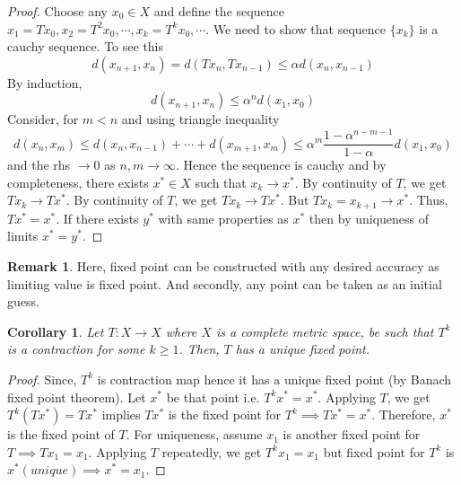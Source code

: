 \documentclass[12pt,reqno]{amsart}
\theoremstyle{plain}
\newtheorem{cor}{Corollary}
\theoremstyle{definition}
\newtheorem{rem}{Remark}
\begin{document}
\begin{proof}
    Choose any $x_0 \in X$ and define the sequence $x_1 = Tx_0, x_2 = T^2x_0, \cdots, x_k = T^kx_0, \cdots.$ We need to show that sequence $\{x_k\}$ is a cauchy sequence. To see this
    $$ d(x_{n+1}, x_n) = d(Tx_n, Tx_{n-1}) \leq \alpha  d(x_n, x_{n-1})$$
    By induction, 
    $$ d(x_{n+1}, x_n) \leq \alpha^n d(x_1, x_0)$$
    Consider, for $m < n$ and using triangle inequality
    $$ d(x_n, x_m) \leq d(x_n, x_{n-1}) + \cdots + d(x_{m+1}, x_m) \leq \alpha^m \frac{1-\alpha^{n-m-1}}{1-\alpha} d(x_1, x_0)$$
    and the rhs $\to 0$ as $n,m \to \infty$. Hence the sequence is cauchy and by completeness, there exists $x^* \in X$ such that $x_k \to x^*$. By  continuity of $T$, we get $Tx_k \to Tx^*$. By continuity of $T$, we get $Tx_k \to Tx^*$. But $Tx_k = x_{k+1} \to x^*$. Thus, $Tx^* = x^*$. If there exists $y^*$ with same properties as $x^*$ then by uniqueness of limits $x^* = y^*$. 
\end{proof}
\begin{rem}
    Here, fixed point can be constructed with any desired accuracy as limiting value is fixed point. And secondly, any point can be taken as an initial guess.
\end{rem}

\begin{cor}
    Let $T \colon X \to X$ where $X$ is a complete metric space, be such that $T^k$ is a contraction for some $k \geq 1$. Then, $T$ has a unique fixed point.
\end{cor}
\begin{proof}
    Since, $T^k$ is contraction map hence it has a unique fixed point (by Banach fixed point theorem). Let $x^*$ be that point i.e. $T^kx^* = x^*$. Applying $T$, we get $T^k (Tx^*) = Tx^*$ implies $Tx^*$ is the fixed point for $T^k \implies Tx^* = x^*$. Therefore, $x^*$ is the fixed point of $T$. For uniqueness, assume $x_1$ is another fixed point for $T \implies Tx_1 = x_1$. Applying $T$ repeatedly, we get $T^kx_1 = x_1$ but fixed point for $T^k$ is $x^*(unique) \implies x^* = x_1$.
\end{proof}
\end{document}
